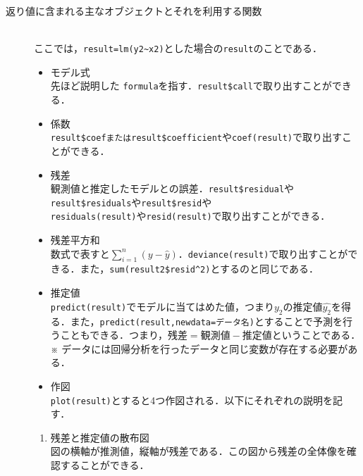 \documentclass[a4paper,10pt,fleqn]{jarticle}
\begin{document}
\begin{description}
\item[返り値に含まれる主なオブジェクトとそれを利用する関数]\mbox{}\\
ここでは，\verb+result=lm(y2~x2)+とした場合の{\tt result}のことである．
\begin{itemize}
\item モデル式 \\
先ほど説明した {\tt formula}を指す．\verb+result$call+で取り出すことができる．
\item 係数 \\
\verb+result$coefまたは+\verb+result$coefficient+や\verb+coef(result)+で取り出すことができる．
\item 残差\\
観測値と推定したモデルとの誤差．\verb+result$residual+や\verb+result$residuals+や\verb+result$resid+や\\
\verb+residuals(result)+や\verb+resid(result)+で取り出すことができる．
\item 残差平方和\\
数式で表すと$\sum \limits ^n _{i=1} \left( y-\hat{y} \right)$．\verb+deviance(result)+で取り出すことができる．また，\verb+sum(result2$resid^2)+とするのと同じである．
\item 推定値\\
\verb+predict(result)+でモデルに当てはめた値，つまり$y_2$の推定値$\hat{y_2}$を得る．また，\verb+predict(result,newdata=データ名)+とすることで予測を行うこともできる．つまり，$\mbox{残差}=\mbox{観測値}-\mbox{推定値}$ということである．\\
※ データには回帰分析を行ったデータと同じ変数が存在する必要がある．
\item 作図\\
\verb+plot(result)+とすると4つ作図される．以下にそれぞれの説明を記す．
\end{itemize}
\begin{indentation}{3em}{0pt}
\begin{enumerate}
\item 残差と推定値の散布図\\
図の横軸が推測値，縦軸が残差である．この図から残差の全体像を確認することができる．
\begin{center}

\end{center}
\end{enumerate}
\end{indentation}
\end{description}
\end{document}
